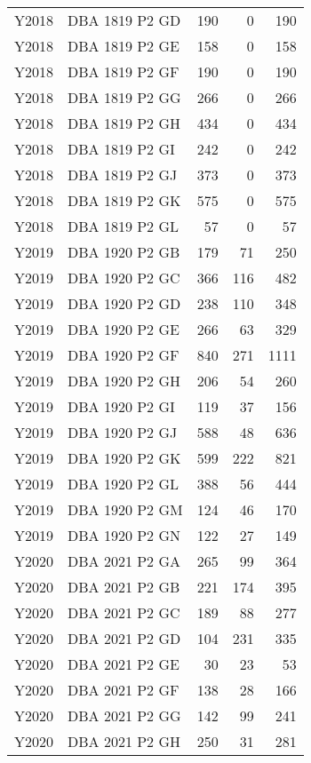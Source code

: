 \begin{longtable}{llrrr}
Y2018 & DBA 1819 P2 GD &   190 &       0 &  190 \\
Y2018 & DBA 1819 P2 GE &   158 &       0 &  158 \\
Y2018 & DBA 1819 P2 GF &   190 &       0 &  190 \\
Y2018 & DBA 1819 P2 GG &   266 &       0 &  266 \\
Y2018 & DBA 1819 P2 GH &   434 &       0 &  434 \\
Y2018 & DBA 1819 P2 GI &   242 &       0 &  242 \\
Y2018 & DBA 1819 P2 GJ &   373 &       0 &  373 \\
Y2018 & DBA 1819 P2 GK &   575 &       0 &  575 \\
Y2018 & DBA 1819 P2 GL &    57 &       0 &   57 \\
Y2019 & DBA 1920 P2 GB &   179 &      71 &  250 \\
Y2019 & DBA 1920 P2 GC &   366 &     116 &  482 \\
Y2019 & DBA 1920 P2 GD &   238 &     110 &  348 \\
Y2019 & DBA 1920 P2 GE &   266 &      63 &  329 \\
Y2019 & DBA 1920 P2 GF &   840 &     271 & 1111 \\
Y2019 & DBA 1920 P2 GH &   206 &      54 &  260 \\
Y2019 & DBA 1920 P2 GI &   119 &      37 &  156 \\
Y2019 & DBA 1920 P2 GJ &   588 &      48 &  636 \\
Y2019 & DBA 1920 P2 GK &   599 &     222 &  821 \\
Y2019 & DBA 1920 P2 GL &   388 &      56 &  444 \\
Y2019 & DBA 1920 P2 GM &   124 &      46 &  170 \\
Y2019 & DBA 1920 P2 GN &   122 &      27 &  149 \\
Y2020 & DBA 2021 P2 GA &   265 &      99 &  364 \\
Y2020 & DBA 2021 P2 GB &   221 &     174 &  395 \\
Y2020 & DBA 2021 P2 GC &   189 &      88 &  277 \\
Y2020 & DBA 2021 P2 GD &   104 &     231 &  335 \\
Y2020 & DBA 2021 P2 GE &    30 &      23 &   53 \\
Y2020 & DBA 2021 P2 GF &   138 &      28 &  166 \\
Y2020 & DBA 2021 P2 GG &   142 &      99 &  241 \\
Y2020 & DBA 2021 P2 GH &   250 &      31 &  281 \\

\end{longtable}
